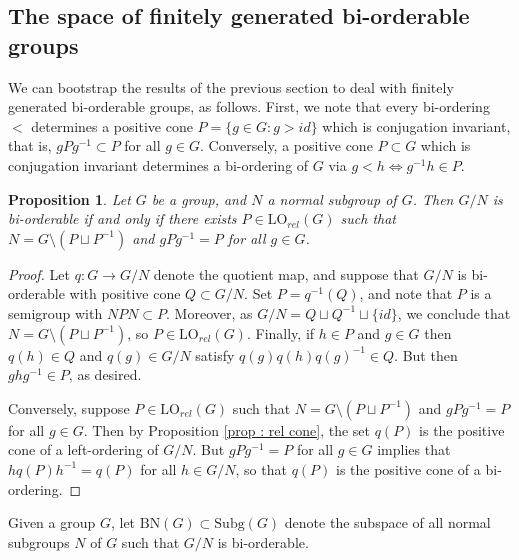 \documentclass{amsart}
\newtheorem{proposition}[theorem]{Proposition}
\theoremstyle{definition}
\theoremstyle{remark}
\begin{document}
\subsection{The space of finitely generated bi-orderable groups}

We can bootstrap the results of the previous section to deal with finitely generated bi-orderable groups, as follows.  First, we note that every bi-ordering $<$ determines a positive cone $P = \{ g \in G : g>id\}$ which is conjugation invariant, that is, $gPg^{-1} \subset P$ for all $g \in G$.  Conversely, a positive cone $P \subset G$ which is conjugation invariant determines a bi-ordering of $G$ via $g<h \iff g^{-1}h \in P$.

\begin{proposition}
\label{prop:birel}
Let $G$ be a group, and $N$ a normal subgroup of $G$.  Then $G/N$ is bi-orderable if and only if there exists $P \in \mathrm{LO}_{rel}(G)$ such that $N = G \setminus (P \sqcup P^{-1})$ and $gPg^{-1} = P$ for all $g \in G$.
\end{proposition}
\begin{proof}
    Let $q \colon G \rightarrow G/N$ denote the quotient map, and suppose that $G/N$ is bi-orderable with positive cone $Q \subset G/N$.  Set $P = q^{-1}(Q)$, and note that $P$ is a semigroup with $NPN \subset P$.  Moreover, as  $G/N = Q \sqcup Q^{-1} \sqcup \{ id \}$, we conclude that $N = G \setminus (P \sqcup P^{-1})$, so $P \in \mathrm{LO}_{rel}(G)$.  Finally, if $h \in P$ and $g \in G$ then $q(h) \in Q$ and $q(g) \in G/N$ satisfy $q(g)q(h)q(g)^{-1} \in Q$.  But then $ghg^{-1} \in P$, as desired.

    Conversely, suppose $P \in \mathrm{LO}_{rel}(G)$ such that $N = G \setminus (P \sqcup P^{-1})$ and $gPg^{-1} = P$ for all $g \in G$.  Then by Proposition \ref{prop : rel cone}, the set $q(P)$ is the positive cone of a left-ordering of $G/N$.  But $gPg^{-1} = P$ for all $g \in G$ implies that $hq(P)h^{-1} = q(P)$ for all $h \in G/N$, so that $q(P)$ is the positive cone of a bi-ordering.
\end{proof}

Given a group $G$, let $\mathrm{BN}(G) \subset \mathrm{Subg}(G)$ denote the subspace of all normal subgroups $N$ of $G$ such that $G/N$ is bi-orderable.
\end{document}
